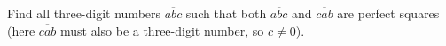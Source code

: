 Find all three-digit numbers $\overline{abc}$ such that both $\overline{abc}$ and $\overline{cab}$ are perfect squares (here $\overline{cab}$ must also be a three-digit number, so $c\ne0$).
